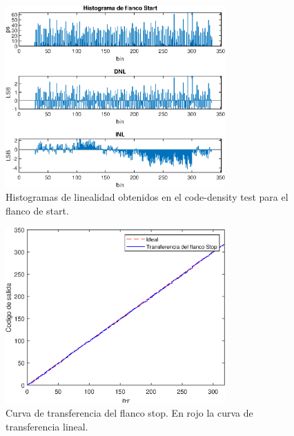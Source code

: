 \begin{figure}[H]
      \centering
      \includegraphics[width=0.75\textwidth]{imagenes/linealidad_start.eps}
      \caption{Histogramas de linealidad obtenidos en el code-density test para el flanco de start.}
      \label{fig: linealidad_start}
\end{figure}


\begin{figure}[H]
     \centering
     \includegraphics[width=0.75\textwidth]{imagenes/transferencia_stop.eps}
     \caption{Curva de transferencia del flanco stop. En rojo la curva de transferencia
     lineal.}
     \label{fig: transferencia_stop}
\end{figure}

